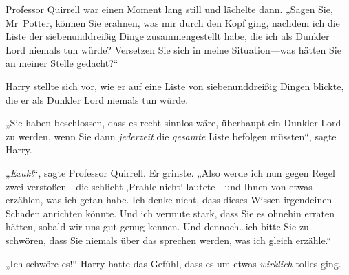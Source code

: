 Professor Quirrell war einen Moment lang still und lächelte dann. „Sagen Sie, Mr~Potter, können Sie erahnen, was mir durch den Kopf ging, nachdem ich die Liste der siebenunddreißig Dinge zusammengestellt habe, die ich als Dunkler Lord niemals tun würde? Versetzen Sie sich in meine Situation—was hätten Sie an meiner Stelle gedacht?“

Harry stellte sich vor, wie er auf eine Liste von siebenunddreißig Dingen blickte, die er als Dunkler Lord niemals tun würde.

„Sie haben beschlossen, dass es recht sinnlos wäre, überhaupt ein Dunkler Lord zu werden, wenn Sie dann \emph{jederzeit} die \emph{gesamte} Liste befolgen müssten“, sagte Harry.

„\emph{Exakt}“, sagte Professor Quirrell. Er grinste. „Also werde ich nun gegen Regel zwei verstoßen—die schlicht ‚Prahle nicht‘ lautete—und Ihnen von etwas erzählen, was ich getan habe. Ich denke nicht, dass dieses Wissen irgendeinen Schaden anrichten könnte. Und ich vermute stark, dass Sie es ohnehin erraten hätten, sobald wir uns gut genug kennen. Und dennoch…ich bitte Sie zu schwören, dass Sie niemals über das sprechen werden, was ich gleich erzähle.“

„Ich schwöre es!“ Harry hatte das Gefühl, dass es um etwas \emph{wirklich} tolles ging.


